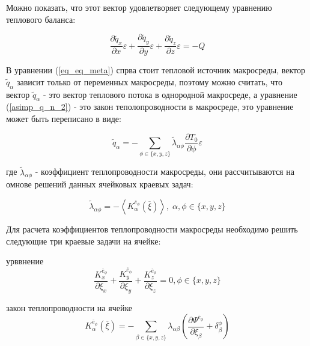 Можно показать, что этот вектор удовлетворяет следующему уравнению теплового баланса:

\begin{equation}
    \label{eq_eq_meta}
    \frac{\partial \widetilde{q}_x}{\partial x}\varepsilon + 
    \frac{\partial \widetilde{q}_y}{\partial y}\varepsilon + 
    \frac{\partial \widetilde{q}_z}{\partial z}\varepsilon = -Q
\end{equation}

В уравнении 
(\ref{eq_eq_meta}) 
спрва стоит тепловой источник макросреды, вектор 
$ \widetilde{q}_{\alpha}$ 
зависит только от переменных макросреды, поэтому можно считать, 
что вектор 
$ \widetilde{q}_{\alpha}$ 
- это вектор теплового потока в однородной макросреде, а уравнение 
(\ref{asimp_q_n_2}) 
- это закон теполопроводности в макросреде, это уравнение может быть переписано
в виде:

\begin{equation}
    \widetilde{q}_{\alpha} = - \sum_{ \phi \in \{x,y,z\} } \widetilde{\lambda}_{\alpha\phi} \frac{\partial T_0}{\partial \phi} \varepsilon
\end{equation}

где 
$ \widetilde{\lambda}_{\alpha\phi}$ 
- коэффициент теплопроводности макросреды, они рассчитываются на омнове решений данных ячейковых краевых задач:

\begin{equation}
    \widetilde{\lambda}_{\alpha\phi} = - \left< K^{ \overline{e}_{\phi}}_{\alpha} \left( \overline{\xi} \right) \right> 
    , \; \alpha,\phi \in \{x,y,z\} 
\end{equation}

Для расчета коэффициентов теплопроводности макросреды необходимо решить следующие три краевые задачи на ячейке:

урввнение
\begin{equation}
    \frac{K^{ \overline{e}_{\phi}}_x}{\partial \xi_x} +
    \frac{K^{ \overline{e}_{\phi}}_y}{\partial \xi_y} +
    \frac{K^{ \overline{e}_{\phi}}_z}{\partial \xi_z} = 0,
    \phi \in \{x,y,z\} 
\end{equation}

закон теплопроводности на ячейке
\begin{equation}
    K^{ \overline{e}_{\phi}}_{\alpha} \left( \overline{\xi} \right) =
    - \sum_{ \beta \in \{x,y,z\} } \lambda_{\alpha\beta}
    \left( \frac{\partial \Psi^{ \overline{e}_{\phi}}}{\partial \xi_{\beta}} + \delta^{\phi}_{\beta} \right) 
\end{equation}

